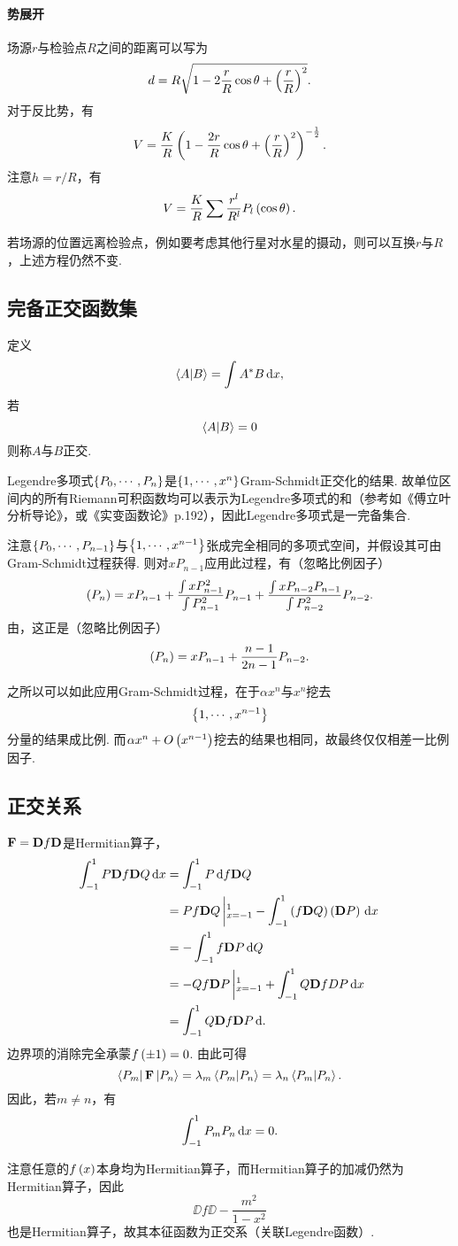 \documentclass[UTF-8]{ctexart}
\begin{document}
  \paragraph{势展开}场源$r$与检验点$R$之间的距离可以写为
  \[ d = R\sqrt{1-2\frac{r}{R}\cos\theta+\left(\frac{r}{R}\right)^2}. \]
  对于反比势，有
  \[ V = \frac{K}{R}\left(1-\frac{2r}{R}\cos\theta+\left(\frac{r}{R}\right)^2\right)^{-\frac{1}{2}}. \]
  注意$h=r/R$，有
  \[ V = \frac{K}{R} \sum \frac{r^l}{R^l}P_l\left(\cos\theta\right). \]
  \par
  若场源的位置远离检验点，例如要考虑其他行星对水星的摄动，则可以互换$r$与$R$，上述方程仍然不变.
  \subsection{完备正交函数集}
  定义
  \[ \bra{A}\ket{B} = \int_{}^{} A^*B \, \mathrm{d} x, \]
  若
  \[ \bra{A}\ket{B} = 0 \]
  则称$A$与$B$正交.
  \par
  Legendre多项式$\left\{P_0,\cdots,P_{n}\right\}$是$\left\{1,\cdots,x^{n}\right\}$Gram-Schmidt正交化的结果. 故单位区间内的所有Riemann可积函数均可以表示为Legendre多项式的和（参考如《傅立叶分析导论》，或《实变函数论》p.192），因此Legendre多项式是一完备集合.
  \par
  注意$\left\{P_0,\cdots,P_{n-1}\right\}$与$\left\{1,\cdots,x^{n-1}\right\}$张成完全相同的多项式空间，并假设其可由Gram-Schmidt过程获得. 则对$xP_{n-1}$应用此过程，有（忽略比例因子）
  \[ \left(P_n\right) = xP_{n-1} + \frac{\int xP_{n-1}^2}{\int P_{n-1}^2}P_{n-1} + \frac{\int x P_{n-2}P_{n-1}}{\int P_{n-2}^2}P_{n-2}. \]
  由，这正是（忽略比例因子）
  \[ \left(P_n\right) = xP_{n-1} + \frac{n-1}{2n-1}P_{n-2}. \]
  \par
  之所以可以如此应用Gram-Schmidt过程，在于$\alpha x^n$与$x^n$挖去\[ \left\{1,\cdots,x^{n-1}\right\} \]分量的结果成比例. 而$\alpha x^n + O\left(x^{n-1}\right)$挖去的结果也相同，故最终仅仅相差一比例因子.
  \subsection{正交关系}
  \label{sssec:oth}
  $\mathbf{F} = \mathbf{D} f\mathbf{D}$是Hermitian算子，
  \begin{align*}
    \int_{-1}^{1} P\mathbf{D} f\mathbf{D} Q \, \mathrm{d} x &= \int_{-1}^{1} P \, \mathrm{d} f\mathbf{D} Q \\
    &= Pf\mathbf{D} Q\left\vert_{x=-1}^{1} - \int_{-1}^{1} \left(f\mathbf{D} Q\right)\left(\mathbf{D} P\right) \, \mathrm{d} x \right. \\
    &= -\int_{-1}^{1} f\mathbf{D} P \, \mathrm{d} Q \\
    &= -Qf\mathbf{D} P\left\vert_{x=-1}^{1} + \int_{-1}^{1} Q\mathbf{D} fDP \, \mathrm{d} x\right. \\
    &= \int_{-1}^{1} Q\mathbf{D} f\mathbf{D} P \, \mathrm{d} .
  \end{align*}
  边界项的消除完全承蒙$f\left(\pm1\right)=0$. 由此可得
  \[ \bra{P_m} \mathbf{F} \ket{P_n} = \lambda_m\bra{P_m}\ket{P_n} = \lambda_n\bra{P_m}\ket{P_n}. \]
  因此，若$m\ne n$，有
  \[ \int_{-1}^{1} P_mP_n \, \mathrm{d} x = 0. \]
  \par
  注意任意的$f\left(x\right)$本身均为Hermitian算子，而Hermitian算子的加减仍然为Hermitian算子，因此
  \[ \DD f \DD - \frac{m^2}{1-x^2} \]
  也是Hermitian算子，故其本征函数为正交系（关联Legendre函数）.
\end{document}
